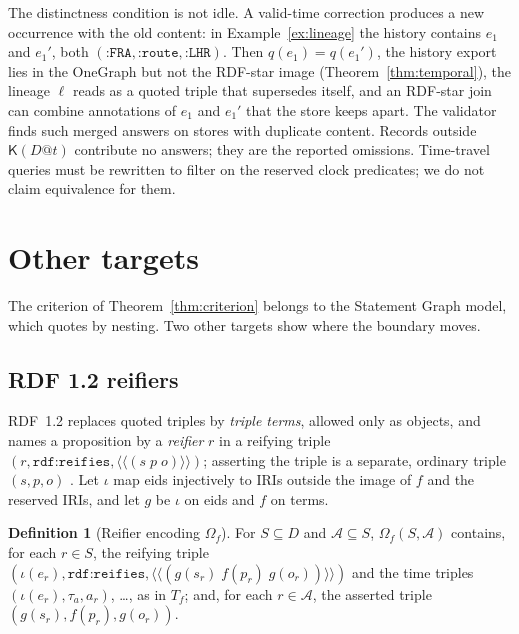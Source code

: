 \documentclass[11pt]{article}
\theoremstyle{plain}
\theoremstyle{definition}
\newtheorem{definition}{Definition}
\theoremstyle{remark}
\newcommand{\iri}[1]{\texttt{#1}}
\newcommand{\Kernel}{\mathsf{K}}
\begin{document}
The distinctness condition is not idle. A valid-time correction produces a new
occurrence with the old content: in Example~\ref{ex:lineage} the history contains
$e_1$ and $e_1'$, both $(\iri{:FRA},\iri{:route},\iri{:LHR})$. Then $q(e_1)=q(e_1')$, the
history export lies in the OneGraph but not the RDF-star image
(Theorem~\ref{thm:temporal}), the lineage $\ell$ reads as a quoted triple that
supersedes itself, and an RDF-star join can combine annotations of $e_1$ and $e_1'$
that the store keeps apart. The validator finds such merged answers on stores with
duplicate content. Records outside $\Kernel(D@t)$ contribute no answers; they are
the reported omissions. Time-travel queries must be rewritten to filter on the
reserved clock predicates; we do not claim equivalence for them.

\section{Other targets}\label{sec:other}
The criterion of Theorem~\ref{thm:criterion} belongs to the Statement Graph model,
which quotes by nesting. Two other targets show where the boundary moves.

\subsection{RDF 1.2 reifiers}
RDF~1.2 replaces quoted triples by \emph{triple terms}, allowed only as objects,
and names a proposition by a \emph{reifier} $r$ in a reifying triple
$(r,\iri{rdf:reifies},\langle\!\langle(s\;p\;o)\rangle\!\rangle)$; asserting the
triple is a separate, ordinary triple $(s,p,o)$ \cite{w3c2026rdf12concepts}. Let
$\iota$ map eids injectively to IRIs outside the image of $f$ and the reserved
IRIs, and let $g$ be $\iota$ on eids and $f$ on terms.

\begin{definition}[Reifier encoding $\Omega_f$]\label{def:rdf12}
For $S\subseteq D$ and $\mathcal A\subseteq S$, $\Omega_f(S,\mathcal A)$ contains,
for each $r\in S$, the reifying triple
$(\iota(e_r),\iri{rdf:reifies},\langle\!\langle(g(s_r)\;f(p_r)\;g(o_r))\rangle\!\rangle)$
and the time triples $(\iota(e_r),\tau_a,a_r)$, \dots, as in $T_f$; and, for each
$r\in\mathcal A$, the asserted triple $(g(s_r),f(p_r),g(o_r))$.
\end{definition}
\end{document}
